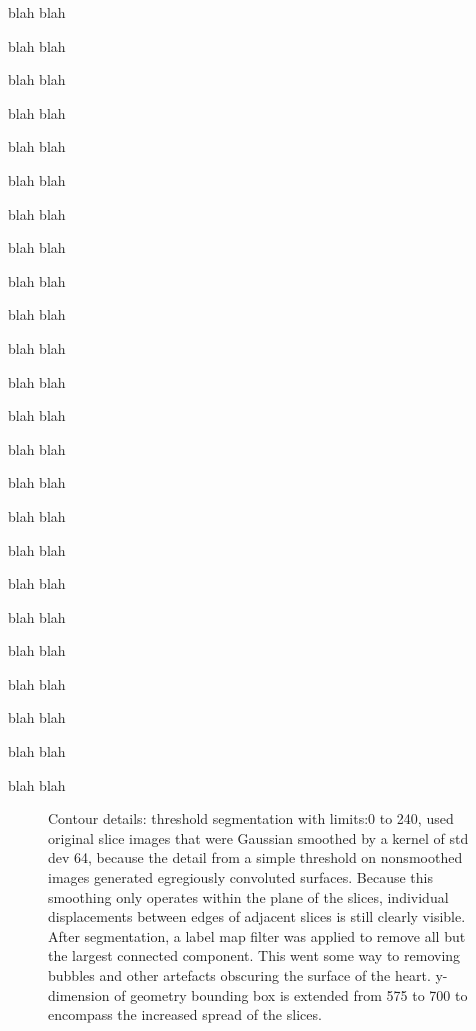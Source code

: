 blah blah

blah blah

blah blah

blah blah

blah blah

blah blah

blah blah

blah blah

blah blah

blah blah

blah blah

blah blah

blah blah

blah blah

blah blah

blah blah

blah blah

blah blah

blah blah

blah blah

blah blah

blah blah

blah blah

blah blah

\begin{figure}
  \centering
  \caption{Contour details: threshold segmentation with limits:0 to 240, used original slice images that were Gaussian smoothed by a kernel of std dev 64, because the detail from a simple threshold on nonsmoothed images generated egregiously convoluted surfaces. Because this smoothing only operates within the plane of the slices, individual displacements between edges of adjacent slices is still clearly visible. After segmentation, a label map filter was applied to remove all but the largest connected component. This went some way to removing bubbles and other artefacts obscuring the surface of the heart. y-dimension of geometry bounding box is extended from 575 to 700 to encompass the increased spread of the slices.}
  \label{fig:image1.png}
\end{figure}

